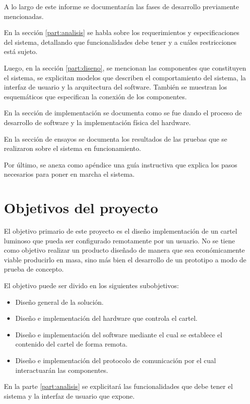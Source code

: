 A lo largo de este informe se documentarán las fases de desarrollo previamente mencionadas.

En la sección \ref{part:analisis} se habla sobre los requerimientos y especificaciones del sistema, detallando que funcionalidades debe tener y a cuáles restricciones está sujeto.

Luego, en la sección \ref{part:diseno}, se mencionan las componentes que constituyen el sistema, se explicitan modelos que describen el comportamiento del sistema, la interfaz de usuario y la arquitectura del software. También se muestran los esquemáticos que especifican la conexión de los componentes.

En la sección de implementación se documenta como se fue dando el proceso de desarrollo de software y la implementación física del hardware.

En la sección de ensayos se documenta los resultados de las pruebas que se realizaron sobre el sistema en funcionamiento.

Por último, se anexa como apéndice una guía instructiva que explica los pasos necesarios para poner en marcha el sistema.

\section{Objetivos del proyecto}
El objetivo primario de este proyecto es el diseño implementación de un cartel luminoso que pueda ser configurado remotamente por un usuario. No se tiene como objetivo realizar un producto diseñado de manera que sea económicamente viable producirlo en masa, sino más bien el desarrollo de un prototipo a modo de prueba de concepto.

El objetivo puede ser divido en los siguientes subobjetivos:
\begin{itemize}
	\item Diseño general de la solución.
	\item Diseño e implementación del hardware que controla el cartel.
	\item Diseño e implementación del software mediante el cual se establece el contenido del cartel de forma remota.
	\item Diseño e implementación del protocolo de comunicación por el cual interactuarán las componentes.
\end{itemize}

En la parte \ref{part:analisis} se explicitará las funcionalidades que debe tener el sistema y la interfaz de usuario que expone.


